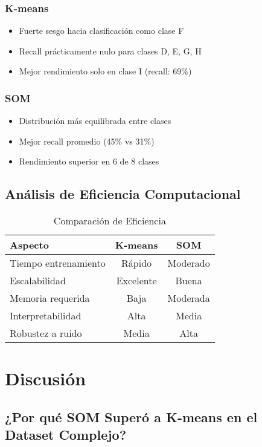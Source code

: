 \documentclass[12pt,a4paper]{article}
\begin{document}
\subsubsection{K-means}
\begin{itemize}
    \item Fuerte sesgo hacia clasificación como clase F
    \item Recall prácticamente nulo para clases D, E, G, H
    \item Mejor rendimiento solo en clase I (recall: 69\%)
\end{itemize}

\subsubsection{SOM}
\begin{itemize}
    \item Distribución más equilibrada entre clases
    \item Mejor recall promedio (45\% vs 31\%)
    \item Rendimiento superior en 6 de 8 clases
\end{itemize}

\subsection{Análisis de Eficiencia Computacional}

\begin{table}[H]
\centering
\caption{Comparación de Eficiencia}
\begin{tabular}{lcc}
\toprule
\textbf{Aspecto} & \textbf{K-means} & \textbf{SOM} \\
\midrule
Tiempo entrenamiento & Rápido & Moderado \\
Escalabilidad & Excelente & Buena \\
Memoria requerida & Baja & Moderada \\
Interpretabilidad & Alta & Media \\
Robustez a ruido & Media & Alta \\
\bottomrule
\end{tabular}
\end{table}

\section{Discusión}

\subsection{¿Por qué SOM Superó a K-means en el Dataset Complejo?}
\end{document}
